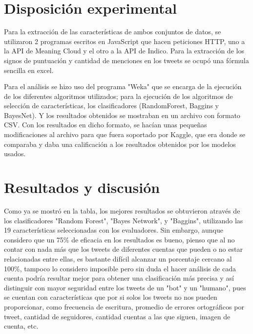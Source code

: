 \documentclass[runningheads]{llncs}
\begin{document}

\section{Disposición experimental}
Para la extracción de las características de ambos conjuntos de datos, se utilizaron 2 programas escritos en JavaScript que hacen peticiones HTTP, uno a la API de Meaning Cloud y el otro a la API de Indico. Para la extracción de los signos de puntuación y cantidad de menciones en los tweets se ocupó una fórmula sencilla en excel.

Para el análisis se hizo uso del programa "Weka" que se encarga de la ejecución de los diferentes algoritmos utilizados; para la ejecución de los algoritmos de selección de características, los clasificadores (RandomForest, Baggins y BayesNet). Y los resultados obtenidos se mostraban en un archivo con formato CSV. Con los resultados en dicho formato, se hacían unas pequeñas modificaciones al archivo para que fuera soportado por Kaggle, que era donde se comparaba y daba una calificación a los resultados obtenidos por los modelos usados.

\section{Resultados y discusión}

 Como ya se mostró en la tabla, los mejores resultados se obtuvieron através de los clasificadores "Random Forest", "Bayes Network", y "Baggins", utilizando las 19 características seleccionadas con los evaluadores. Sin embargo, aunque considero que un 75\% de eficacia en los resultados es bueno, pienso que al no contar con nada más que los tweets de diferentes cuentas que pueden o no estar relacionadas entre ellas, es bastante difícil alcanzar un porcentaje cercano al 100\%, tampoco lo considero imposible pero sin duda el hacer análisis de cada cuenta podría resultar mejor para obtener una clasificación más precisa y así distinguir con mayor seguridad entre los tweets de un "bot" y un "humano", pues se cuentan con características que por si solos los tweets no nos pueden proporcionar, como frecuencia de escritura, promedio de errores ortográficos por tweet, cantidad de seguidores, cantidad cuentas a las que siguen, imagen de cuenta, etc. 
\end{document}
